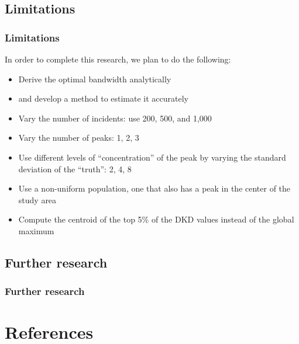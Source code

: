 \documentclass[notheorems]{beamer}
\theoremstyle{definition}
\theoremstyle{example}
\begin{document}
\subsection{Limitations}
\begin{frame}\frametitle{Limitations}
    In order to complete this research, we plan to do the following:
    \begin{itemize}
        \item Derive the \alert{optimal bandwidth} analytically
        \item \textellipsis and develop a method to estimate it accurately
        \item Vary the number of incidents: use 200, 500, and 1,000
        \item Vary the number of peaks: 1, 2, 3
        \item Use different levels of ``concentration'' of the peak by varying the standard deviation of the ``truth'': 2, 4, 8
        \item Use a non-uniform population, one that also has a peak in the center of the study area
        \item Compute the centroid of the top 5\% of the DKD values instead of the global maximum
    \end{itemize}
\end{frame}

\subsection{Further research}
\begin{frame}\frametitle{Further research}
\end{frame}

\section*{References}
\end{document}
